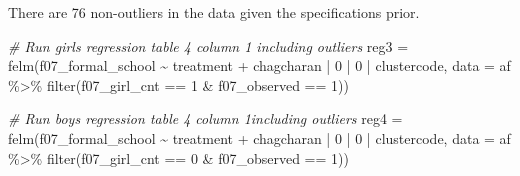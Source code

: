 \documentclass[
]{article}
\newenvironment{Shaded}{\begin{snugshade}}{\end{snugshade}}
\newcommand{\AttributeTok}[1]{\textcolor[rgb]{0.77,0.63,0.00}{#1}}
\newcommand{\CommentTok}[1]{\textcolor[rgb]{0.56,0.35,0.01}{\textit{#1}}}
\newcommand{\DecValTok}[1]{\textcolor[rgb]{0.00,0.00,0.81}{#1}}
\newcommand{\FunctionTok}[1]{\textcolor[rgb]{0.00,0.00,0.00}{#1}}
\newcommand{\NormalTok}[1]{#1}
\newcommand{\OtherTok}[1]{\textcolor[rgb]{0.56,0.35,0.01}{#1}}
\newcommand{\SpecialCharTok}[1]{\textcolor[rgb]{0.00,0.00,0.00}{#1}}
\begin{document}
There are 76 non-outliers in the data given the specifications prior.

\begin{Shaded}
\begin{Highlighting}[]
\CommentTok{\# Run girls regression table 4 column 1 including outliers}
\NormalTok{reg3 }\OtherTok{=} \FunctionTok{felm}\NormalTok{(f07\_formal\_school }\SpecialCharTok{\textasciitilde{}}\NormalTok{ treatment }\SpecialCharTok{+}\NormalTok{ chagcharan }\SpecialCharTok{|} \DecValTok{0} \SpecialCharTok{|} \DecValTok{0} \SpecialCharTok{|}\NormalTok{ clustercode, }
            \AttributeTok{data =}\NormalTok{ af }\SpecialCharTok{\%\textgreater{}\%} \FunctionTok{filter}\NormalTok{(f07\_girl\_cnt }\SpecialCharTok{==} \DecValTok{1} \SpecialCharTok{\&} 
\NormalTok{                                 f07\_observed }\SpecialCharTok{==} \DecValTok{1}\NormalTok{))}

\CommentTok{\# Run boys regression table 4 column 1including outliers}
\NormalTok{reg4 }\OtherTok{=} \FunctionTok{felm}\NormalTok{(f07\_formal\_school }\SpecialCharTok{\textasciitilde{}}\NormalTok{ treatment }\SpecialCharTok{+}\NormalTok{ chagcharan }\SpecialCharTok{|} \DecValTok{0} \SpecialCharTok{|} \DecValTok{0} \SpecialCharTok{|}\NormalTok{ clustercode, }
            \AttributeTok{data =}\NormalTok{ af }\SpecialCharTok{\%\textgreater{}\%} \FunctionTok{filter}\NormalTok{(f07\_girl\_cnt }\SpecialCharTok{==} \DecValTok{0} \SpecialCharTok{\&} 
\NormalTok{                                 f07\_observed }\SpecialCharTok{==} \DecValTok{1}\NormalTok{))}
\end{Highlighting}
\end{Shaded}
\end{document}
